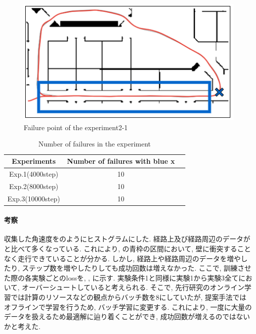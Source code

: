 \begin{figure}[h]
  \centering
  \includegraphics[keepaspectratio, scale=0.5]{images/result2.png}
  \caption{Failure point of the experiment2-1}
  \label{Fig:result2}
  \end{figure}

\begin{table}[h]
  \centering
  \begin{tabular}{|c|c|c|} \hline
    Experiments & Number of failures with blue x \\ \hline
    Exp.1(4000step) & 10 \\ \hline
    Exp.2(8000step) & 10 \\ \hline
    Exp.3(10000step) & 10 \\ \hline
  \end{tabular}
  \caption{Number of failures in the experiment}
  \label{tb:fail2}
\end{table}

\newpage
\paragraph{考察}
収集した角速度をのようにヒストグラムにした. 経路上及び経路周辺のデータがと比べて多くなっている. これにより, の青枠の区間において, 壁に衝突することなく走行できていることが分かる. しかし, 経路上や経路周辺のデータを増やしたり, ステップ数を増やしたりしても成功回数は増えなかった. ここで, 訓練させた際の各実験ごとのlossを, , に示す. 実験条件1と同様に実験1から実験3全てにおいて, オーバーシュートしていると考えられる. そこで, 先行研究のオンライン学習では計算のリソースなどの観点からバッチ数を8にしていたが, 提案手法ではオフラインで学習を行うため, バッチ学習に変更する. これにより, 一度に大量のデータを扱えるため最適解に辿り着くことができ, 成功回数が増えるのではないかと考えた. 

